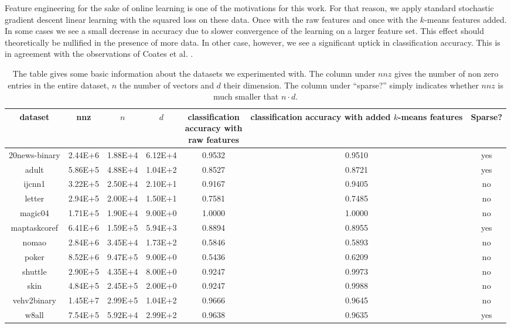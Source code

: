 \documentclass{article}
\begin{document}
Feature engineering for the sake of online learning is one of the motivations for this work.
For that reason, we apply standard stochastic gradient descent linear learning with the squared loss on these data.
Once with the raw features and once with the $k$-means features added. 
In some cases we see a small decrease in accuracy due to slower convergence of the learning on a larger feature set.
This effect should theoretically be nullified in the presence of more data.
In other case, however, we see a significant uptick in classification accuracy. This is in agreement with the observations of Coates et al. \cite{CoatesNL11}.

\newcommand{\ttt}[2]{ \parbox{#1pt}{\vspace{0.1cm} \noindent  #2 \vspace{0.1cm}}}
\begin{table}[htdp]
\begin{center}
\begin{tabular}{|c|c|c|c|c|c|c|} \hline
dataset		&	nnz		& $n$	&	$d$	& \ttt{70}{classification \\ accuracy  with  \\ raw features}  & \ttt{90}{classification \\ accuracy with added \\ $k$-means features}	& Sparse?		\\ \hline
20news-binary	&	2.44E+6	&	1.88E+4	&	6.12E+4	& 0.9532	& 0.9510	& yes			\\ \hline %
adult			&	5.86E+5	&	4.88E+4	&	1.04E+2	& 0.8527	& 0.8721	& yes			\\ \hline
ijcnn1		&	3.22E+5	&	2.50E+4	&	2.10E+1	& 0.9167	& 0.9405	& no			\\ \hline %
letter			&	2.94E+5	&	2.00E+4	&	1.50E+1	& 0.7581	& 0.7485	&no			\\ \hline
magic04		&	1.71E+5	&	1.90E+4	&	9.00E+0	& 1.0000	& 1.0000	&no		 	\\ \hline
maptaskcoref	&	6.41E+6	&	1.59E+5	&	5.94E+3	& 0.8894  & 0.8955	&yes		 	\\ \hline
nomao		&	2.84E+6	&	3.45E+4	&	1.73E+2	& 0.5846	& 0.5893	&no		 	\\ \hline
poker		&	8.52E+6	&	9.47E+5	&	9.00E+0	& 0.5436	& 0.6209	&no		  	\\ \hline
shuttle		&	2.90E+5	&	4.35E+4	&	8.00E+0	& 0.9247	& 0.9973	&no		 	\\ \hline
skin			&	4.84E+5	&	2.45E+5	&	2.00E+0	& 0.9247	& 0.9988	&no		 	\\ \hline
vehv2binary	&	1.45E+7	&	2.99E+5	&	1.04E+2	& 0.9666	& 0.9645	&no		 	\\ \hline
w8all			&	7.54E+5	&	5.92E+4	&	2.99E+2	& 0.9638	& 0.9635	&yes		 	\\ \hline
\end{tabular}
\end{center}
\caption{The table gives some basic information about the datasets we experimented with. 
The column under $nnz$ gives the number of non zero entries in the entire dataset, $n$ the number of vectors and $d$ their dimension.
The column under ``sparse?'' simply indicates whether $nnz$ is much smaller that $n\cdot d$.}
\label{table1}
\end{table}%
\end{document}
